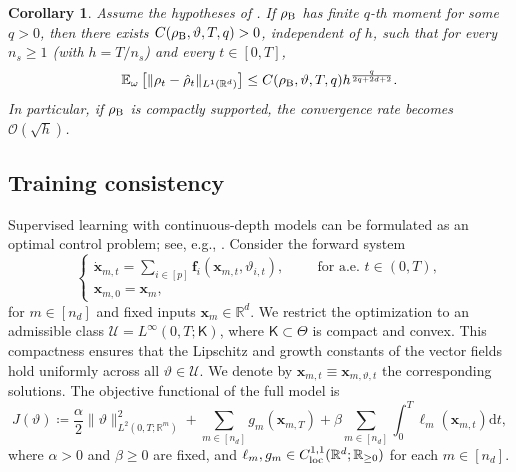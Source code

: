 \documentclass[twoside,11pt]{article}
\theoremstyle{plain}
\newtheorem{corollary}[theorem]{Corollary}
\def\R{\mathbb R}
\def\E{\mathbb E}
\newcommand{\diff}{\mathrm{d}}
\newcommand{\bff}{\mathbf{f}}
\newcommand{\bfx}{\mathbf{x}}
\begin{document}
\begin{corollary}\label{cor:L1bound}
Assume the hypotheses of . If $\rho_{\rm B}$ has finite $q$-th moment for some $q>0$, then there exists $C(\rho_{\rm B},\vartheta,T,q)>0$, independent of $h$, such that for every $n_s\ge1$ (with $h=T/n_s$) and every $t\in[0,T]$,
\begin{equation}\label{eq:L1rate}
\E_{\omega}\left[\|\rho_t-\hat\rho_t\|_{L^1(\R^d)}\right] \le C(\rho_{\rm B},\vartheta,T,q) h^{\frac{q}{2q+2d+2}}.
\end{equation}
In particular, if $\rho_{\rm B}$ is compactly supported, the convergence rate becomes $\mathcal{O}(\sqrt{h})$.
\end{corollary}



\subsection{Training consistency}\label{ss:train}

Supervised learning with continuous-depth models can be formulated as an optimal control problem; see, e.g., \cite{weinanoptimalcontrol,EGePiZua}. Consider the forward system
\begin{equation}\label{eq:forward_full}
\begin{cases}
\dot{\bfx}_{m,t} = \sum_{i\in[p]} \bff_i(\bfx_{m,t},\vartheta_{i,t}), \hspace{1cm} \text{for a.e. } t\in (0,T),\\
\bfx_{m,0}=\bfx_{m},
\end{cases}
\end{equation}
for $m\in[n_d]$ and fixed inputs $\bfx_{m}\in\R^d$. We restrict the optimization to an admissible class $\mathcal U = L^\infty(0,T;\mathsf K)$, where $\mathsf K \subset \Theta$ is compact and convex. This compactness ensures that the Lipschitz and growth constants of the vector fields hold uniformly across all $\vartheta\in\mathcal U$. We denote by $\bfx_{m,t}\equiv\bfx_{m,\vartheta,t}$ the corresponding solutions. The objective functional of the full model is
\begin{equation}\label{eq:objective_full}
J(\vartheta) \coloneqq \frac{\alpha}{2}\|\vartheta\|_{L^2(0,T;\R^m)}^2 + \sum_{m\in[n_d]}g_m(\bfx_{m,T}) + \beta\sum_{m\in[n_d]} \int_0^T \ell_m(\bfx_{m,t}) \diff t,
\end{equation}
where $\alpha>0$ and $\beta\geq0$ are fixed, and $\ell_m, g_m \in {C}^{1,1}_{\rm loc}(\R^d; \R_{\geq0})$ for each $m\in[n_d]$. 
\end{document}
